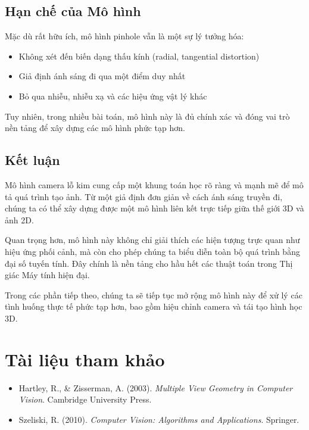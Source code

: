 \subsection{Hạn chế của Mô hình}
\label{subsec:pinhole_limitations}

Mặc dù rất hữu ích, mô hình pinhole vẫn là một sự lý tưởng hóa:

\begin{itemize}
	\item Không xét đến biến dạng thấu kính (radial, tangential distortion)
	\item Giả định ánh sáng đi qua một điểm duy nhất
	\item Bỏ qua nhiễu, nhiễu xạ và các hiệu ứng vật lý khác
\end{itemize}

Tuy nhiên, trong nhiều bài toán, mô hình này là đủ chính xác và đóng vai trò nền tảng để xây dựng các mô hình phức tạp hơn.

\subsection*{Kết luận}
\label{subsec:pinhole_conclusion}

Mô hình camera lỗ kim cung cấp một khung toán học rõ ràng và mạnh mẽ để mô tả quá trình tạo ảnh. Từ một giả định đơn giản về cách ánh sáng truyền đi, chúng ta có thể xây dựng được một mô hình liên kết trực tiếp giữa thế giới 3D và ảnh 2D.

Quan trọng hơn, mô hình này không chỉ giải thích các hiện tượng trực quan như hiệu ứng phối cảnh, mà còn cho phép chúng ta biểu diễn toàn bộ quá trình bằng đại số tuyến tính. Đây chính là nền tảng cho hầu hết các thuật toán trong Thị giác Máy tính hiện đại.

Trong các phần tiếp theo, chúng ta sẽ tiếp tục mở rộng mô hình này để xử lý các tình huống thực tế phức tạp hơn, bao gồm hiệu chỉnh camera và tái tạo hình học 3D.

\section*{Tài liệu tham khảo}
\begin{itemize}
	\item[1] Hartley, R., \& Zisserman, A. (2003). \textit{Multiple View Geometry in Computer Vision}. Cambridge University Press.
	\item[2] Szeliski, R. (2010). \textit{Computer Vision: Algorithms and Applications}. Springer.
\end{itemize}